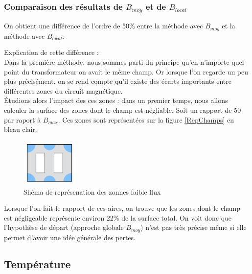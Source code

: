 \subsubsection{Comparaison des résultats de $B_{moy}$ et de $B_{local}$}

On obtient une différence de l'ordre de 50\% entre la méthode avec $B_{moy}$  et la méthode avec $B_{local}$.

Explication de cette différence : \\
	Dans la première méthode, nous sommes parti du principe qu'en n'importe quel point du transformateur on avait le même champ. Or lorsque l'on regarde un peu plus précisément, on se rend compte qu'il existe des écarts importants entre différentes zones du circuit magnétique.\\
Étudions alors l'impact des ces zones : dans un premier temps, nous allons calculer la surface des zones dont le champ est négliable. Soit un rapport de 50 par raport à $B_{max}$. Ces zones sont représentées sur la figure \ref{RepChamps} en bleau clair. 

\begin{figure}[ht]
	\begin{center}
	\includegraphics[width=0.25\textwidth]{images/TP3_zones_mortes}
	\caption{Shéma de représenation des zonnes faible flux}\label{img:RepChamps}
	\end{center}
\end{figure}
\FloatBarrier

Lorsque l'on fait le rapport de ces aires, on trouve que les zones dont le champ est négligeable représente environ 22\% de la surface total. On voit donc que l'hypothèse de départ (approche globale $B_{moy}$) n'est pas très précise même si elle permet d'avoir une idée générale des pertes.


\subsection{Température}

